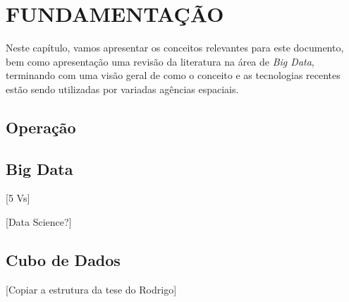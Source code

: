 
\chapter{FUNDAMENTAÇÃO}

Neste capítulo, vamos apresentar os conceitos relevantes para este documento, bem como apresentação uma revisão da literatura na área de \textit{Big Data}, terminando com uma visão geral de como o conceito e as tecnologias recentes estão sendo utilizadas por variadas agências espaciais.

\section{Operação}

\section{Big Data}

[5 Vs]

[Data Science?]

\section{Cubo de Dados}

[Copiar a estrutura da tese do Rodrigo]

